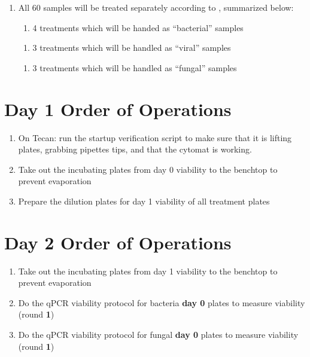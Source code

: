 \documentclass{article}
\begin{document}
\begin{enumerate}
    \item All 60 samples will be treated separately according to , summarized below:
    
    \begin{enumerate}
        \item 4 treatments which will be handed as “bacterial” samples
    \end{enumerate}
    \begin{enumerate}
        \item 3 treatments which will be handled as “viral” samples
    \end{enumerate}
    \begin{enumerate}
        \item 3 treatments which will be handled as “fungal” samples
    \end{enumerate}
\end{enumerate}

\section*{Day 1 Order of Operations} \label{day1instructions}
\begin{enumerate}
    \item On Tecan: run the startup verification script to make sure that it is lifting plates, grabbing pipettes tips, and that the cytomat is working. 
    \item Take out the incubating plates from day 0 viability to the benchtop to prevent evaporation
    \item Prepare the dilution plates for day 1 viability of all treatment plates
\end{enumerate}

\section*{Day 2 Order of Operations} \label{day1instructions}
\begin{enumerate}
    \item Take out the incubating plates from day 1 viability to the benchtop to prevent evaporation
    \item Do the qPCR viability protocol for bacteria \textbf{day 0} plates to measure viability (round \textbf{1})
    \item Do the qPCR viability protocol for fungal \textbf{day 0} plates to measure viability (round \textbf{1})
\end{enumerate}
\end{document}
